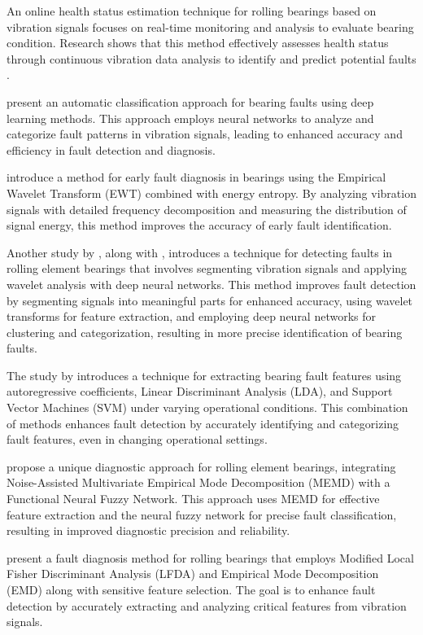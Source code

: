 \documentclass[sn-basic,pdflatex]{sn-jnl}
\theoremstyle{remark}
\theoremstyle{definition}
\begin{document}
An online health status estimation technique for rolling bearings based
on vibration signals focuses on real-time monitoring and analysis to
evaluate bearing condition. Research shows that this method effectively
assesses health status through continuous vibration data analysis to
identify and predict potential faults \citep{WOS:000452922000015}.

\citet{WOS:000453413600001} present an automatic classification approach
for bearing faults using deep learning methods. This approach employs
neural networks to analyze and categorize fault patterns in vibration
signals, leading to enhanced accuracy and efficiency in fault detection
and diagnosis.

\citet{WOS:000452819600235} introduce a method for early fault diagnosis
in bearings using the Empirical Wavelet Transform (EWT) combined with
energy entropy. By analyzing vibration signals with detailed frequency
decomposition and measuring the distribution of signal energy, this
method improves the accuracy of early fault identification.

Another study by \citet{WOS:000450745100001}, along with
\citet{WOS:000449334500118}, introduces a technique for detecting faults
in rolling element bearings that involves segmenting vibration signals
and applying wavelet analysis with deep neural networks. This method
improves fault detection by segmenting signals into meaningful parts for
enhanced accuracy, using wavelet transforms for feature extraction, and
employing deep neural networks for clustering and categorization,
resulting in more precise identification of bearing faults.

The study by \citet{WOS:000440977000032} introduces a technique for
extracting bearing fault features using autoregressive coefficients,
Linear Discriminant Analysis (LDA), and Support Vector Machines (SVM)
under varying operational conditions. This combination of methods
enhances fault detection by accurately identifying and categorizing
fault features, even in changing operational settings.

\citet{WOS:000434717400001} propose a unique diagnostic approach for
rolling element bearings, integrating Noise-Assisted Multivariate
Empirical Mode Decomposition (MEMD) with a Functional Neural Fuzzy
Network. This approach uses MEMD for effective feature extraction and
the neural fuzzy network for precise fault classification, resulting in
improved diagnostic precision and reliability.

\citet{WOS:000426284100001} present a fault diagnosis method for rolling
bearings that employs Modified Local Fisher Discriminant Analysis (LFDA)
and Empirical Mode Decomposition (EMD) along with sensitive feature
selection. The goal is to enhance fault detection by accurately
extracting and analyzing critical features from vibration signals.
\end{document}
